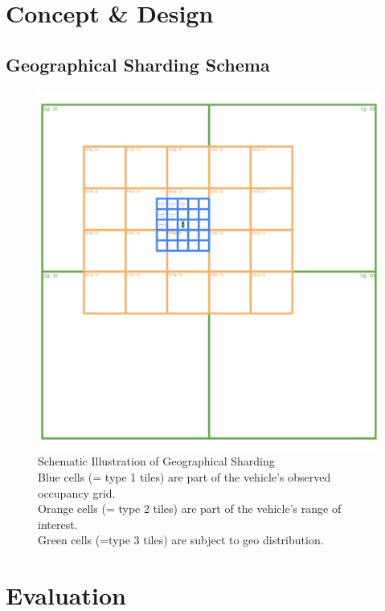 \section{Concept \& Design}
\label{sec:appendix:texts:concept_design}

\subsection{Geographical Sharding Schema}
\label{subsec:appendix:texts:concept_design:geographical_partitioning_schema}
\begin{figure}
	\centering
	\includegraphics[width=0.9\linewidth]{98_images/geo_subscription_schema}
	\caption[Schematic Illustration of Geographical Sharding]{Schematic Illustration of Geographical Sharding \\ Blue cells (= type 1 tiles) are part of the vehicle's observed occupancy grid. \\ Orange cells (= type 2 tiles) are part of the vehicle's range of interest. \\ Green cells (=type 3 tiles) are subject to geo distribution.}
	\label{fig:geo_distribution_schema}
\end{figure}

\section{Evaluation}
\label{sec:appendix:texts:evaluation}


